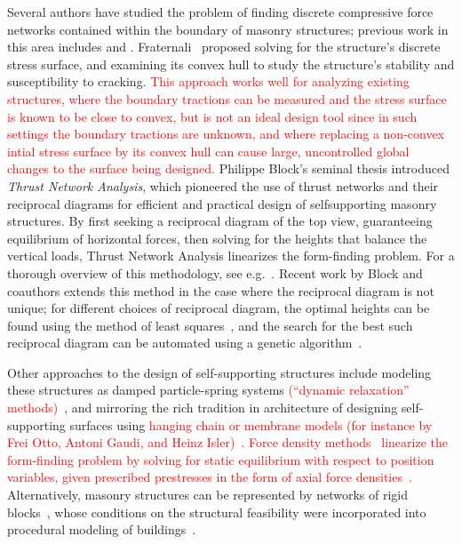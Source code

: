 \documentclass[annual]{acmsiggraph}
\newcommand{\newtext}[1]{\textcolor{red}{#1}}
\begin{document}
Several authors have studied the problem of finding discrete compressive
force networks contained within the boundary of masonry structures; previous
work in this area includes \cite{O'Dwyer98} and
\cite{andreu-2007}. Fraternali~ proposed solving
for the structure's discrete stress surface, and examining its convex hull
to study the structure's stability and susceptibility to cracking. \newtext{This approach works well for analyzing existing structures, where the boundary tractions can be measured and the stress surface is known to be close to convex, but is not an ideal design tool since in such settings the boundary tractions are unknown, and where replacing a non-convex intial stress surface by its convex hull can cause large, uncontrolled global changes to the surface being designed.}
Philippe Block's seminal thesis introduced {\it Thrust
Network Analysis}, which pioneered the use of thrust networks and their
reciprocal diagrams for efficient and practical design of self\dash supporting
masonry structures. By first seeking a reciprocal diagram of the top view, guaranteeing equilibrium
of horizontal forces, then solving for the heights that balance the
vertical loads, Thrust Network Analysis linearizes the form-finding problem.
For a thorough overview of this methodology, see e.g.\ \cite{Block07,block09}.
Recent work by Block and coauthors extends this method in the case where the reciprocal diagram
is not unique; for different choices of reciprocal diagram, the optimal
heights can be found using the method of least squares~\cite{vanmele2011},
and the search for the best such reciprocal diagram can be automated using
a genetic algorithm~\cite{Block2011}.

Other approaches to the design of self-supporting structures
include modeling these structures as damped particle-spring
systems \newtext{(``dynamic relaxation'' methods)}~\cite{Kilian2005,barnes09}, and mirroring the rich tradition in
architecture of designing self-supporting surfaces using \newtext{hanging chain
or membrane models (for instance by Frei Otto, Antoni Gaudi, and Heinz Isler)~\cite{Heyman98,Kotnik12}.} \newtext{Force density methods~\cite{linkwitz71} linearize the form-finding problem by solving for static equilibrium with respect to position variables, given prescribed prestresses in the form of axial force densities~\cite{grundig00}.} Alternatively, masonry structures can be
represented by networks of rigid blocks~\cite{Livesley92}, whose conditions
on the structural feasibility were incorporated into procedural modeling
of buildings~\cite{Whiting09}.
\end{document}
